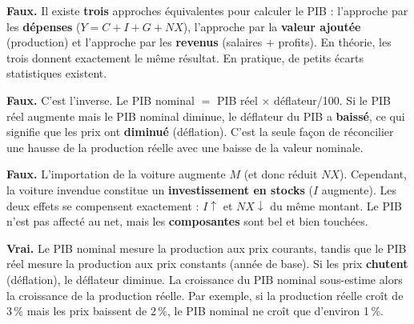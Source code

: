 
\begin{reponse}
\textbf{Faux.} Il existe \textbf{trois} approches équivalentes pour calculer le PIB : l'approche par les \textbf{dépenses} ($Y = C + I + G + NX$), l'approche par la \textbf{valeur ajoutée} (production) et l'approche par les \textbf{revenus} (salaires + profits). En théorie, les trois donnent exactement le même résultat. En pratique, de petits écarts statistiques existent.
\end{reponse}


\begin{reponse}
\textbf{Faux.} C'est l'inverse. Le PIB nominal $=$ PIB réel $\times$ déflateur/100. Si le PIB réel augmente mais le PIB nominal diminue, le déflateur du PIB a \textbf{baissé}, ce qui signifie que les prix ont \textbf{diminué} (déflation). C'est la seule façon de réconcilier une hausse de la production réelle avec une baisse de la valeur nominale.
\end{reponse}


\begin{reponse}
\textbf{Faux.} L'importation de la voiture augmente $M$ (et donc réduit $NX$). Cependant, la voiture invendue constitue un \textbf{investissement en stocks} ($I$ augmente). Les deux effets se compensent exactement : $I\uparrow$ et $NX\downarrow$ du même montant. Le PIB n'est pas affecté au net, mais les \textbf{composantes} sont bel et bien touchées.
\end{reponse}


\begin{reponse}
\textbf{Vrai.} Le PIB nominal mesure la production aux prix courants, tandis que le PIB réel mesure la production aux prix constants (année de base). Si les prix \textbf{chutent} (déflation), le déflateur diminue. La croissance du PIB nominal sous-estime alors la croissance de la production réelle. Par exemple, si la production réelle croît de 3\,\% mais les prix baissent de 2\,\%, le PIB nominal ne croît que d'environ 1\,\%.
\end{reponse}

